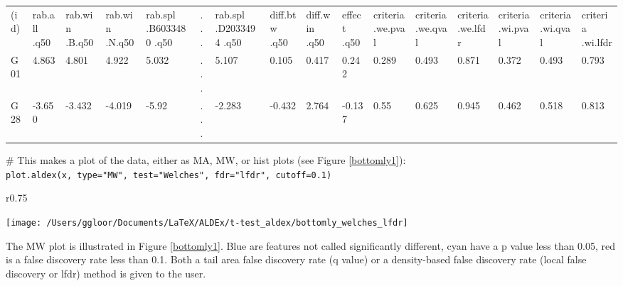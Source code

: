 \documentclass[11pt]{amsart}
\begin{document}
{\scriptsize
\noindent\begin{tabular}{ p{0.50cm} p{0.80cm}  p{0.80cm} p{0.80cm}  p{1.1cm} p{0.2cm} p{1.1cm}  p{0.80cm} p{0.80cm}  p{0.80cm} p{0.80cm}  p{0.80cm} p{0.80cm}  p{0.80cm} p{0.80cm}  p{0.80cm}}
(id) & rab.all .q50 & rab.win .B.q50 & rab.win .N.q50 & rab.spl .B6033480 .q50 & ... & rab.spl .D2033494 .q50 & diff.btw .q50 & diff.win .q50 & effect .q50 & criteria .we.pval & criteria .we.qval & criteria .we.lfdr & criteria .wi.pval & criteria .wi.qval & criteria .wi.lfdr\\
G01 & 4.863 & 4.801 & 4.922 & 5.032 & ... & 5.107 & 0.105 & 0.417 & 0.242 & 0.289 & 0.493 & 0.871 & 0.372 & 0.493 & 0.793\\
G28 & -3.650 & -3.432 & -4.019 & -5.92 & ... & -2.283 & -0.432 & 2.764 & -0.137 & 0.55 & 0.625 & 0.945 & 0.462 & 0.518 & 0.813\\

\end{tabular}
\label{default}
}

\noindent\# This makes a plot of the data, either as MA, MW, or hist plots (see Figure \ref{bottomly1}):\\

\noindent\texttt{plot.aldex(x, type="MW", test="Welches", fdr="lfdr", cutoff=0.1)}\\


\begin{wrapfigure}{r}{0.75\textwidth}\vspace{-1cm}
\begin{center}
\texttt{[image: /Users/ggloor/Documents/LaTeX/ALDEx/t-test\_aldex/bottomly\_welches\_lfdr]}
\caption{Differential expression in the Bottomly dataset using Welches t-test and density based false discovery rate set at 0.1}
\label{bottomly1}
\end{center}\vspace{-.5cm}
\end{wrapfigure}

The MW plot is illustrated in Figure \ref{bottomly1}. Blue are features not called significantly different, cyan have a p value less than 0.05, red is a false discovery rate less than 0.1. Both a tail area false discovery rate (q value) or a density-based false discovery rate (local false discovery or lfdr) method is given to the user.
\end{document}
